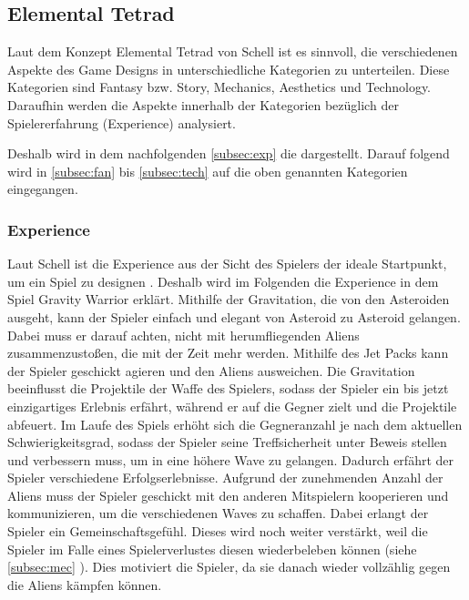 \documentclass[11pt]{scrartcl}
\begin{document}
\subsection{Elemental Tetrad}
Laut dem Konzept Elemental Tetrad von Schell\cite[~p.41]{S2014} ist es sinnvoll, die verschiedenen Aspekte des Game Designs in unterschiedliche Kategorien zu unterteilen. Diese Kategorien sind Fantasy bzw. Story, Mechanics, Aesthetics und Technology. Daraufhin werden die Aspekte innerhalb der Kategorien bezüglich der Spielererfahrung (Experience) analysiert.

Deshalb wird in dem nachfolgenden \autoref{subsec:exp} die  dargestellt. Darauf folgend wird in \ref{subsec:fan} bis \ref{subsec:tech} auf die oben genannten Kategorien eingegangen.

\subsubsection{Experience}
\label{subsec:exp}
Laut Schell ist die Experience aus der Sicht des Spielers der ideale Startpunkt, um ein Spiel zu designen \cite[~p. xxiii]{S2014}. Deshalb wird im Folgenden die Experience in dem Spiel Gravity Warrior erklärt. 
Mithilfe der Gravitation, die von den Asteroiden ausgeht, kann der Spieler einfach und elegant von Asteroid zu Asteroid gelangen. Dabei muss er darauf achten, nicht mit herumfliegenden Aliens zusammenzustoßen, die mit der Zeit mehr werden. Mithilfe des Jet Packs kann der Spieler geschickt agieren und den Aliens ausweichen. Die Gravitation beeinflusst die Projektile der Waffe des Spielers, sodass der Spieler ein bis jetzt einzigartiges Erlebnis erfährt, während er auf die Gegner zielt und die Projektile abfeuert. Im Laufe des Spiels erhöht sich die Gegneranzahl je nach dem aktuellen Schwierigkeitsgrad, sodass der Spieler seine Treffsicherheit unter Beweis stellen und verbessern muss, um in eine höhere Wave zu gelangen. Dadurch erfährt der Spieler verschiedene Erfolgserlebnisse. 
Aufgrund der zunehmenden Anzahl der Aliens muss der Spieler geschickt mit den anderen Mitspielern kooperieren und kommunizieren, um die verschiedenen Waves zu schaffen. Dabei erlangt der Spieler ein Gemeinschaftsgefühl. Dieses wird noch weiter verstärkt, weil die Spieler im Falle eines Spielerverlustes diesen wiederbeleben können (siehe \autoref{subsec:mec} ). Dies motiviert die Spieler, da sie danach wieder vollzählig gegen die Aliens kämpfen können. 
\end{document}
